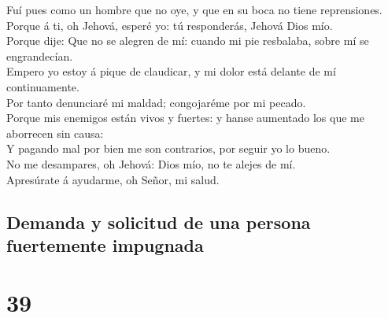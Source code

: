  Fuí pues como un hombre que no oye, y que en su boca no
tiene reprensiones.\\
 Porque á ti, oh Jehová, esperé yo: tú responderás,
Jehová Dios mío.\\
 Porque dije: Que no se alegren de mí: cuando mi pie
resbalaba, sobre mí se engrandecían.\\
 Empero yo estoy á pique de claudicar, y mi dolor está
delante de mí continuamente.\\
 Por tanto denunciaré mi maldad; congojaréme por mi
pecado.\\
 Porque mis enemigos están vivos y fuertes: y hanse
aumentado los que me aborrecen sin causa:\\
 Y pagando mal por bien me son contrarios, por seguir yo
lo bueno.\\
 No me desampares, oh Jehová: Dios mío, no te alejes de
mí.\\
 Apresúrate á ayudarme, oh Señor, mi salud.

\hypertarget{demanda-y-solicitud-de-una-persona-fuertemente-impugnada}{%
\subsection{Demanda y solicitud de una persona fuertemente
impugnada}\label{demanda-y-solicitud-de-una-persona-fuertemente-impugnada}}

\hypertarget{section-38}{%
\section{39}\label{section-38}}

